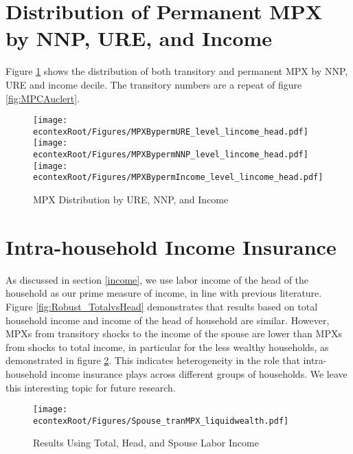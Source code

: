 \documentclass[titlepage]{\econtex}\newcommand{\texname}{ConsumptionHeterogeneity}
\begin{document}
\section{Distribution of Permanent MPX by NNP, URE, and Income} \label{PermMPXbyURENNP}
\setcounter{figure}{0}   
\setcounter{table}{0} 
Figure \ref{fig:MPCAuclert_perm} shows the distribution of both transitory and permanent MPX by NNP, URE and income decile. The transitory numbers are a repeat of figure \ref{fig:MPCAuclert}.
\begin{figure} 
	\begin{centering}
		\texttt{[image: \\econtexRoot/Figures/MPXBypermURE\_level\_lincome\_head.pdf]}
		\texttt{[image: \\econtexRoot/Figures/MPXBypermNNP\_level\_lincome\_head.pdf]}
		\texttt{[image: \\econtexRoot/Figures/MPXBypermIncome\_level\_lincome\_head.pdf]}
		\caption{MPX Distribution by URE, NNP, and Income}
		\label{fig:MPCAuclert_perm}
	\end{centering}
\end{figure}

\section{Intra-household Income Insurance} \label{Insurance}
\setcounter{figure}{0}   
\setcounter{table}{0} 
As discussed in section \ref{income}, we use labor income of the head of the household as our prime measure of income, in line with previous literature. Figure \ref{fig:Robust_TotalvsHead} demonstrates that results based on total household income and income of the head of household are similar. However, MPXs from transitory shocks to the income of the spouse are lower than MPXs from shocks to total income, in particular for the less wealthy households, as demonstrated in figure \ref{fig:Robust_Spouse}. This indicates heterogeneity in the role that intra-household income insurance plays across different groups of households. We leave this interesting topic for future research. 


\begin{figure} 
	\begin{centering}
		\texttt{[image: \\econtexRoot/Figures/Spouse\_tranMPX\_liquidwealth.pdf]}
		\caption{Results Using Total, Head, and Spouse Labor Income}
		\label{fig:Robust_Spouse}
	\end{centering}
\end{figure}



\end{document}
